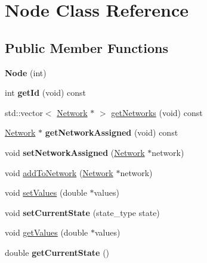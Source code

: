 \hypertarget{classNode}{}\section{Node Class Reference}
\label{classNode}
\subsection*{Public Member Functions}
\begin{DoxyCompactItemize}
\item 
{\bfseries Node} (int)\hypertarget{classNode_aff71d952af8363f046a67a8b12194e46}{}\label{classNode_aff71d952af8363f046a67a8b12194e46}

\item 
int {\bfseries get\+Id} (void) const \hypertarget{classNode_a962c1706091481c7ae0552cf6232e1fe}{}\label{classNode_a962c1706091481c7ae0552cf6232e1fe}

\item 
std\+::vector$<$ \hyperlink{classNetwork}{Network} $\ast$ $>$ \hyperlink{classNode_abb91c473b57d816afd9c3a3ebd8d8b8a}{get\+Networks} (void) const 
\item 
\hyperlink{classNetwork}{Network} $\ast$ {\bfseries get\+Network\+Assigned} (void) const \hypertarget{classNode_aa8b0d5bdeeb3ca58b241e96f4bc7d662}{}\label{classNode_aa8b0d5bdeeb3ca58b241e96f4bc7d662}

\item 
void {\bfseries set\+Network\+Assigned} (\hyperlink{classNetwork}{Network} $\ast$network)\hypertarget{classNode_ac652ab341f6ea808146a3d557b889468}{}\label{classNode_ac652ab341f6ea808146a3d557b889468}

\item 
void \hyperlink{classNode_aae6f1c4d0ddcdcdc83bdc572009d9a4a}{add\+To\+Network} (\hyperlink{classNetwork}{Network} $\ast$network)
\item 
void \hyperlink{classNode_a507e58ea4aa68188b159643fbd90e657}{set\+Values} (double $\ast$values)
\item 
void {\bfseries set\+Current\+State} (state\+\_\+type state)\hypertarget{classNode_a6b10486fcfffdc3ba4e92378c8b86fcd}{}\label{classNode_a6b10486fcfffdc3ba4e92378c8b86fcd}

\item 
void \hyperlink{classNode_a5fc3cc057fe9e72d71c207f369f88f34}{get\+Values} (double $\ast$values)
\item 
double {\bfseries get\+Current\+State} ()\hypertarget{classNode_a69708281dcb26b5c2068153cce56de32}{}\label{classNode_a69708281dcb26b5c2068153cce56de32}


\end{DoxyCompactItemize}
